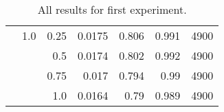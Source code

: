 \begin{table}[H]
\begin{tabular}{rrrrrrr}
              & 1.0           & 0.25          & 0.0175               & 0.806                   & 0.991                   & 4900          \\
              &               & 0.5           & 0.0174               & 0.802                   & 0.992                   & 4900          \\
              &               & 0.75          & 0.017                & 0.794                   & 0.99                    & 4900          \\
              &               & 1.0           & 0.0164               & 0.79                    & 0.989                   & 4900         
\end{tabular}
\caption{All results for first experiment.}
\end{table}